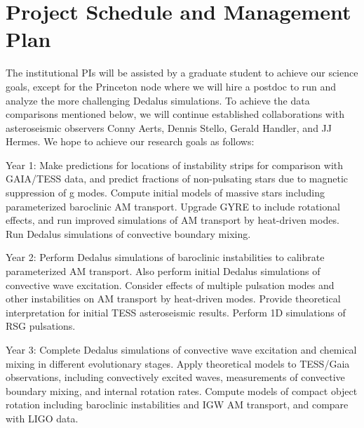 \section{Project Schedule and Management Plan}

The institutional PIs will be assisted by a graduate student to achieve our science goals, except for the Princeton node where we will hire a postdoc to run and analyze the more challenging Dedalus simulations. To achieve the data comparisons mentioned below, we will continue established collaborations with asteroseismic observers Conny Aerts, Dennis Stello, Gerald Handler, and JJ Hermes. We hope to achieve our research goals as follows:

Year 1: Make predictions for locations of instability strips for comparison with GAIA/TESS data, and predict fractions of non-pulsating stars due to magnetic suppression of g modes. Compute initial models of massive stars including parameterized baroclinic AM transport. Upgrade GYRE to include rotational effects, and run improved simulations of AM transport by heat-driven modes. Run Dedalus simulations of convective boundary mixing.

Year 2: Perform Dedalus simulations of baroclinic instabilities to calibrate parameterized AM transport. Also perform initial Dedalus simulations of convective wave excitation. Consider effects of multiple pulsation modes and other instabilities on AM transport by heat-driven modes. Provide theoretical interpretation for initial TESS asteroseismic results. Perform 1D simulations of RSG pulsations.

Year 3: Complete Dedalus simulations of convective wave excitation and chemical mixing in different evolutionary stages. Apply theoretical models to TESS/Gaia observations, including convectively excited waves, measurements of convective boundary mixing, and internal rotation rates. Compute models of compact object rotation including baroclinic instabilities and IGW AM transport, and compare with LIGO data.

